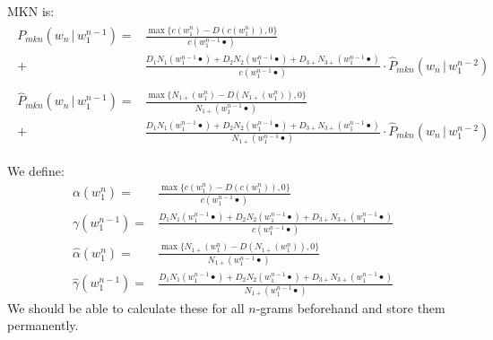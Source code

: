 \documentclass[11pt,a4paper]{article}
\newcommand\givenbase[1][]{\,#1\lvert\,}
\let\given\givenbase
\newcommand{\probSymbol}[1][]{P_{#1}}
\newcommand{\prob}[2][]{\probSymbol[#1](#2)}
\newcommand{\probCond}[3][]{\prob[#1]{#2 \given #3}}
\newcommand{\probSymbolLower}[1][]{\hat{P}_{#1}}
\newcommand{\probLower}[2][]{\probSymbolLower[#1](#2)}
\newcommand{\probCondLower}[3][]{\probLower[#1]{#2 \given #3}}
\begin{document}
MKN is:
\begin{align}
  \begin{split}
    \probCond[mkn]{w_n}{w_1^{n-1}} =        &\frac{\max{\{c(w_1^n) - D(c(w_1^n)), 0\}}}
                                                  {c(w_1^{n-1} \bullet)} \\
                                          + &\frac{  D_1    N_1   (w_1^{n-1} \bullet)
                                                   + D_2    N_2   (w_1^{n-1} \bullet)
                                                   + D_{3+} N_{3+}(w_1^{n-1} \bullet)}
                                             {c(w_1^{n-1} \bullet)}
                                          \cdot \probCondLower[mkn]{w_n}{w_1^{n-2}}
  \end{split} \\
  \begin{split}
    \probCondLower[mkn]{w_n}{w_1^{n-1}} =   &\frac{\max{\{N_{1+}(w_1^n) - D(N_{1+}(w_1^n)), 0\}}}
                                                  {N_{1+}(w_1^{n-1} \bullet)} \\
                                          + &\frac{  D_1    N_1   (w_1^{n-1} \bullet)
                                                   + D_2    N_2   (w_1^{n-1} \bullet)
                                                   + D_{3+} N_{3+}(w_1^{n-1} \bullet)}
                                             {N_{1+}(w_1^{n-1} \bullet)}
                                          \cdot \probCondLower[mkn]{w_n}{w_1^{n-2}}
  \end{split}
\end{align}

We define:
\begin{align}
  \alpha(w_1^n)     =& \frac{\max{\{c(w_1^n) - D(c(w_1^n)), 0\}}}{c(w_1^{n-1} \bullet)} \\
  \gamma(w_1^{n-1}) =& \frac{  D_1    N_1   (w_1^{n-1} \bullet)
                           + D_2    N_2   (w_1^{n-1} \bullet)
                           + D_{3+} N_{3+}(w_1^{n-1} \bullet)}
                          {c(w_1^{n-1} \bullet)} \\
  \hat\alpha(w_1^n)     =& \frac{\max{\{N_{1+}(w_1^n) - D(N_{1+}(w_1^n)), 0\}}}{N_{1+}(w_1^{n-1} \bullet)} \\
  \hat\gamma(w_1^{n-1}) =& \frac{  D_1    N_1   (w_1^{n-1} \bullet)
                           + D_2    N_2   (w_1^{n-1} \bullet)
                           + D_{3+} N_{3+}(w_1^{n-1} \bullet)}
                          {N_{1+}(w_1^{n-1} \bullet)}
\end{align}
We should be able to calculate these for all $n$-grams beforehand and store
them permanently.
\end{document}
